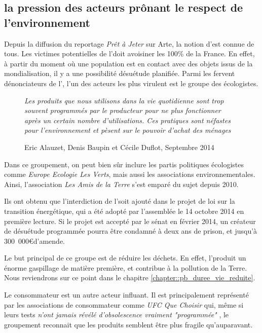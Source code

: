 \subsection{la pression des acteurs prônant le respect de l'environnement }
Depuis la diffusion du reportage \textit{Prêt à Jeter} sur Arte, la notion d'\op est connue de tous. 
Les victimes potentielles de l'\op doit avoisiner les 100\% de la France. En effet, à partir du moment où une population est en contact avec des objets issus de la mondialisation, il y a une possibilité désuétude planifiée. 
Parmi les fervent dénonciateurs de l'\op, l'un des acteurs les plus virulent est le groupe des écologistes. 

\begin{wrapfigure}{r}{0.3\textwidth}
\vspace{-4mm}\og  \textit{Les produits que nous utilisons dans la vie quotidienne sont trop souvent programmés par le producteur pour ne plus fonctionner après un certain nombre d'utilisations. Ces pratiques sont néfastes pour l'environnement et pèsent sur le pouvoir d'achat des ménages} \fg{} \caption{Eric Alauzet, Denis Baupin et Cécile Duflot, Septembre 2014}
\end{wrapfigure}

Dans ce groupement, on peut bien sûr inclure les partis politiques écologistes  comme \textit{Europe Ecologie Les Verts}, mais aussi les associations environnementales. Ainsi, l'association \textit{Les Amis de la Terre} s'est emparé du sujet depuis 2010. 


Ils ont obtenu que l'interdiction de l'\op soit ajouté dans le projet de loi sur la transition énergétique, qui a été adopté par l'assemblée le 14 octobre 2014 en première lecture. Si le projet est accepté par le sénat en février 2014, un créateur de désuétude programmée pourra être condamné à deux ans de prison, et jusqu'à 300~000\euro d'amende. 

Le but principal de ce groupe est de réduire les déchets. En effet, l'\op produit un énorme gaspillage de matière première, et contribue à la pollution de la Terre. Nous reviendrons sur ce point dans le chapitre \ref{chapter::pb_duree_vie_reduite}.

\medbreak Le consommateur est un autre acteur influant. Il est principalement  représenté par les associations de consommateur comme \textit{UFC Que Choisir} qui, même si leurs tests \og \textit{n'ont jamais révélé d'obsolescence vraiment "programmée" }\fg{}  , le groupement reconnait que les produits semblent être plus fragile qu'auparavant\cite{ufc_OP}. 

